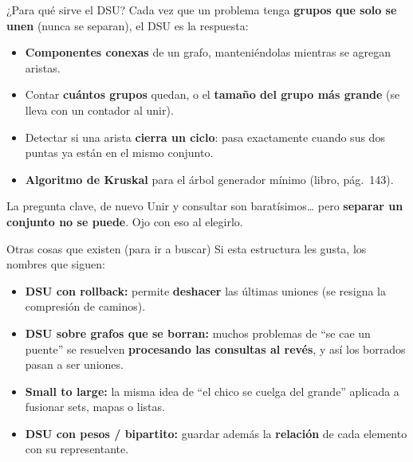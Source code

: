 \documentclass{beamer}
\begin{document}
\begin{frame}{¿Para qué sirve el DSU?}
    Cada vez que un problema tenga \textbf{grupos que solo se unen} (nunca se
    separan), el DSU es la respuesta:
    \begin{itemize}
        \item \textbf{Componentes conexas} de un grafo, manteniéndolas
              mientras se agregan aristas.
        \item Contar \textbf{cuántos grupos} quedan, o el \textbf{tamaño del
              grupo más grande} (se lleva con un contador al unir).
        \item Detectar si una arista \textbf{cierra un ciclo}:
              pasa exactamente cuando sus dos puntas ya están en el mismo conjunto.
        \item \textbf{Algoritmo de Kruskal} para el árbol generador mínimo
              (libro, pág.~143).
    \end{itemize}

    \vspace{0.2cm}
    \begin{alertblock}{La pregunta clave, de nuevo}
        \centering
        Unir y consultar son baratísimos\ldots{} pero \textbf{separar un
        conjunto no se puede}. Ojo con eso al elegirlo.
    \end{alertblock}
\end{frame}


\begin{frame}{Otras cosas que existen (para ir a buscar)}
    Si esta estructura les gusta, los nombres que siguen:
    \begin{itemize}
        \item \textbf{DSU con rollback:} permite \textbf{deshacer} las últimas
              uniones (se resigna la compresión de caminos).
        \item \textbf{DSU sobre grafos que se borran:} muchos problemas de
              ``se cae un puente'' se resuelven \textbf{procesando las
              consultas al revés}, y así los borrados pasan a ser uniones.
        \item \textbf{Small to large:} la misma idea de ``el chico se cuelga
              del grande'' aplicada a fusionar sets, mapas o listas.
        \item \textbf{DSU con pesos / bipartito:} guardar además la
              \textbf{relación} de cada elemento con su representante.
    \end{itemize}
\end{frame}
\end{document}

